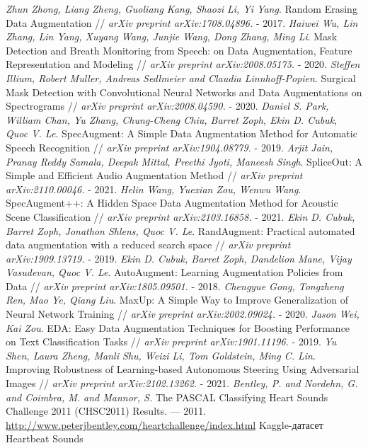 \documentclass[12pt, fleqn]{article}
\begin{document}
\begin{thebibliography}{3}
	\textit{Zhun Zhong, Liang Zheng, Guoliang Kang, Shaozi Li, Yi Yang}. Random Erasing Data Augmentation // \textit{arXiv preprint arXiv:1708.04896.} - 2017.
	\textit{Haiwei Wu, Lin Zhang, Lin Yang, Xuyang Wang, Junjie Wang, Dong Zhang, Ming Li}. Mask Detection and Breath Monitoring from Speech: on Data Augmentation,
	Feature Representation and Modeling // \textit{arXiv preprint arXiv:2008.05175.} - 2020.
	\textit{Steffen Illium, Robert Muller, Andreas Sedlmeier and Claudia Linnhoff-Popien}. Surgical Mask Detection with Convolutional Neural Networks and Data
	Augmentations on Spectrograms // \textit{arXiv preprint arXiv:2008.04590.} - 2020.
	\textit{Daniel S. Park, William Chan, Yu Zhang, Chung-Cheng Chiu, Barret Zoph, Ekin D. Cubuk, Quoc V. Le}. SpecAugment: A Simple Data Augmentation Method
	for Automatic Speech Recognition // \textit{arXiv preprint arXiv:1904.08779.} - 2019.
	\textit{Arjit Jain, Pranay Reddy Samala, Deepak Mittal, Preethi Jyoti, Maneesh Singh}. SpliceOut: A Simple and Efficient Audio Augmentation Method // \textit{arXiv preprint arXiv:2110.00046.} - 2021.
	\textit{Helin Wang, Yuexian Zou, Wenwu Wang}. SpecAugment++: A Hidden Space Data Augmentation Method for Acoustic Scene Classification // \textit{arXiv preprint arXiv:2103.16858.} - 2021.
	\textit{Ekin D. Cubuk, Barret Zoph, Jonathon Shlens, Quoc V. Le}. RandAugment: Practical automated data augmentation with a reduced search space // \textit{arXiv preprint arXiv:1909.13719.} - 2019.
	\textit{Ekin D. Cubuk, Barret Zoph, Dandelion Mane, Vijay Vasudevan, Quoc V. Le}. AutoAugment: Learning Augmentation Policies from Data // \textit{arXiv preprint arXiv:1805.09501.} - 2018.
	\textit{Chengyue Gong, Tongzheng Ren, Mao Ye, Qiang Liu}. MaxUp: A Simple Way to Improve Generalization of Neural Network Training // \textit{arXiv preprint arXiv:2002.09024.} - 2020.
	\textit{Jason Wei, Kai Zou}. EDA: Easy Data Augmentation Techniques for Boosting Performance on Text Classification Tasks // \textit{arXiv preprint arXiv:1901.11196.} - 2019.
	\textit{Yu Shen, Laura Zheng, Manli Shu, Weizi Li, Tom Goldstein, Ming C. Lin}. Improving Robustness of Learning-based Autonomous Steering Using Adversarial Images // \textit{arXiv preprint arXiv:2102.13262.} - 2021.
	\textit{Bentley, P. and Nordehn, G. and Coimbra, M. and Mannor, S.} The {PASCAL} {C}lassifying {H}eart {S}ounds {C}hallenge 2011 {(CHSC2011)} {R}esults. --- 2011.
	\url{http://www.peterjbentley.com/heartchallenge/index.html}
	Kaggle-датасет Heartbeat Sounds
	

\end{thebibliography}
\end{document}
